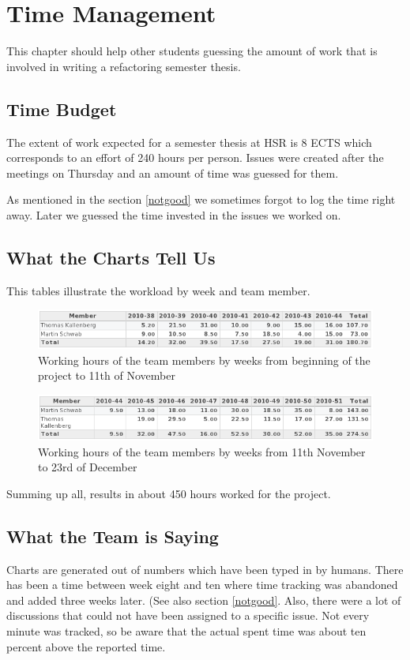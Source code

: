 \chapter{Time Management}
\thispagestyle{fancy}
This chapter should help other students guessing the amount of work that is 
involved in writing a refactoring semester thesis.

\section{Time Budget}
The extent of work expected for a semester thesis at HSR is 8 ECTS which 
corresponds to an effort of 240 hours per person. Issues were created after 
the meetings on Thursday and an amount of time was guessed for them.

As mentioned in the section \ref{notgood} we sometimes forgot to log the time
right away. Later we guessed the time invested in the issues we worked on.

\section{What the Charts Tell Us}
This tables illustrate the workload by week and team member.

\begin{figure}[h]
\includegraphics[width=1\textwidth]{images/timetable1.png}
\caption{Working hours of the team members by weeks from beginning of the
project to 11th of November}
\label{timetable1}
\end{figure}

\begin{figure}[h]
\includegraphics[width=1\textwidth]{images/timetable2.png}
\caption{Working hours of the team members by weeks from 11th November to 23rd
of December}
\label{timetable2}
\end{figure}

Summing up all, results in about 450 hours worked for the project.

\section{What the Team is Saying}
Charts are generated out of numbers which have been typed in by humans. There 
has been a time between week eight and ten where time tracking was abandoned and 
added three weeks later. (See also section \ref{notgood}. Also, there were a lot
of discussions that could not have been assigned to a specific issue. Not every
minute was tracked, so be aware that the actual spent time was about ten percent
above the reported time.